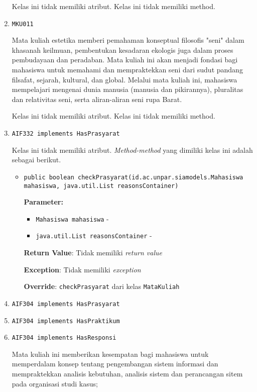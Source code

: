 \documentclass{article}
\begin{document}
\begin{enumerate}
Kelas ini tidak memiliki atribut. Kelas ini tidak memiliki method. \item \texttt{MKU011}

Mata kuliah estetika memberi pemahaman konseptual filosofis "seni" dalam khasanah keilmuan, 
 pembentukan kesadaran ekologis juga dalam proses pembudayaan dan peradaban. Mata kuliah ini 
 akan menjadi fondasi bagi mahasiswa untuk memahami dan mempraktekkan seni dari sudut pandang
 filsafat, sejarah, kultural, dan global. Melalui mata kuliah ini, mahasiswa mempelajari
 mengenai dunia manusia (manusia dan pikirannya), pluralitas dan relativitas seni, serta 
 aliran-aliran seni rupa Barat.

Kelas ini tidak memiliki atribut. Kelas ini tidak memiliki method. \item \texttt{AIF332 implements HasPrasyarat}



Kelas ini tidak memiliki atribut. \textit{Method-method} yang dimiliki kelas ini adalah sebagai berikut.
\begin{itemize}
\item \texttt{public boolean checkPrasyarat(id.ac.unpar.siamodels.Mahasiswa mahasiswa, java.util.List reasonsContainer)}



\textbf{Parameter:}
\begin{itemize}
\item \texttt{Mahasiswa mahasiswa} - 
\item \texttt{java.util.List reasonsContainer} - 
\end{itemize}
\textbf{Return Value}: Tidak memiliki \textit{return value}

\textbf{Exception}: Tidak memiliki \textit{exception}

\textbf{Override}: \texttt{checkPrasyarat} dari kelas \texttt{MataKuliah}

\end{itemize}
\item \texttt{AIF304 implements HasPrasyarat}

\item \texttt{AIF304 implements HasPraktikum}

\item \texttt{AIF304 implements HasResponsi}

Mata kuliah ini memberikan kesempatan bagi mahasiswa untuk memperdalam konsep
 tentang pengembangan sistem informasi dan mempraktekkan analisis kebutuhan,
 analisis sistem dan perancangan sitem pada organisasi studi kasus;


\end{enumerate}
\end{document}
